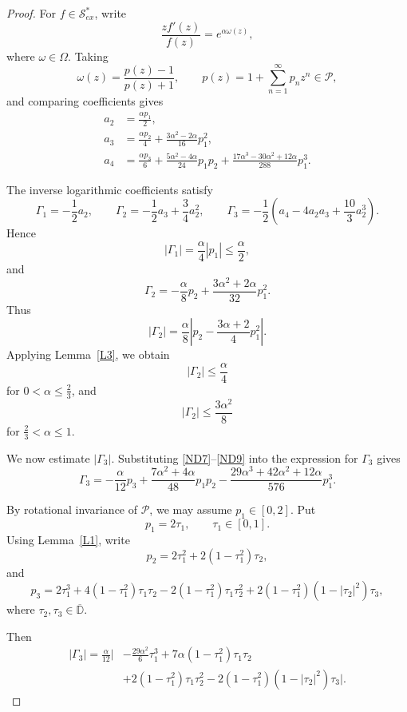 \documentclass[10pt,a4paper]{amsart}
\numberwithin{equation}{section}
\begin{document}
\begin{proof}
For $f\in\mathcal{S}_{ex}^{\ast}$, write
\[
\frac{zf'(z)}{f(z)}=e^{\alpha\omega(z)},
\]
where $\omega\in\Omega$. Taking
\[
\omega(z)=\frac{p(z)-1}{p(z)+1},
\qquad
p(z)=1+\sum_{n=1}^{\infty} p_n z^n\in\mathcal{P},
\]
and comparing coefficients gives
\begin{align}
a_2&=\frac{\alpha p_1}{2},\label{ND7}\\
a_3&=\frac{\alpha p_2}{4}
+\frac{3\alpha^2-2\alpha}{16}p_1^2,\label{ND8}\\
a_4&=\frac{\alpha p_3}{6}
+\frac{5\alpha^2-4\alpha}{24}p_1p_2
+\frac{17\alpha^3-30\alpha^2+12\alpha}{288}p_1^3.\label{ND9}
\end{align}

The inverse logarithmic coefficients satisfy
\[
\Gamma_1=-\frac12 a_2,\qquad
\Gamma_2=-\frac12 a_3+\frac34 a_2^2,\qquad
\Gamma_3=-\frac12\left(a_4-4a_2a_3+\frac{10}{3}a_2^3\right).
\]
Hence
\[
|\Gamma_1|=\frac{\alpha}{4}|p_1|\le \frac{\alpha}{2},
\]
and
\[
\Gamma_2
=-\frac{\alpha}{8}p_2
+\frac{3\alpha^2+2\alpha}{32}p_1^2.
\]
Thus
\[
|\Gamma_2|
=\frac{\alpha}{8}
\left|p_2-\frac{3\alpha+2}{4}p_1^2\right|.
\]
Applying Lemma~\ref{L3}, we obtain
\[
|\Gamma_2|\le \frac{\alpha}{4}
\]
for $0<\alpha\le \frac23$, and
\[
|\Gamma_2|\le \frac{3\alpha^2}{8}
\]
for $\frac23<\alpha\le 1$.

We now estimate $|\Gamma_3|$. Substituting \eqref{ND7}--\eqref{ND9} into the expression for $\Gamma_3$ gives
\begin{equation}\label{ND11}
\Gamma_3
=
-\frac{\alpha}{12}p_3
+\frac{7\alpha^2+4\alpha}{48}p_1p_2
-\frac{29\alpha^3+42\alpha^2+12\alpha}{576}p_1^3.
\end{equation}

By rotational invariance of $\mathcal{P}$, we may assume $p_1\in[0,2]$. Put
\[
p_1=2\tau_1,\qquad \tau_1\in[0,1].
\]
Using Lemma~\ref{L1}, write
\[
p_2=2\tau_1^2+2(1-\tau_1^2)\tau_2,
\]
and
\[
p_3
=
2\tau_1^3
+4(1-\tau_1^2)\tau_1\tau_2
-2(1-\tau_1^2)\tau_1\tau_2^2
+2(1-\tau_1^2)(1-|\tau_2|^2)\tau_3,
\]
where $\tau_2,\tau_3\in\overline{\mathbb{D}}$.

Then
\begin{equation}\label{ND12}
\begin{aligned}
|\Gamma_3|
=
\frac{\alpha}{12}\Bigg|
&-\frac{29\alpha^2}{6}\tau_1^3
+7\alpha(1-\tau_1^2)\tau_1\tau_2\\
&+2(1-\tau_1^2)\tau_1\tau_2^2
-2(1-\tau_1^2)(1-|\tau_2|^2)\tau_3
\Bigg|.
\end{aligned}
\end{equation}


\end{proof}
\end{document}
